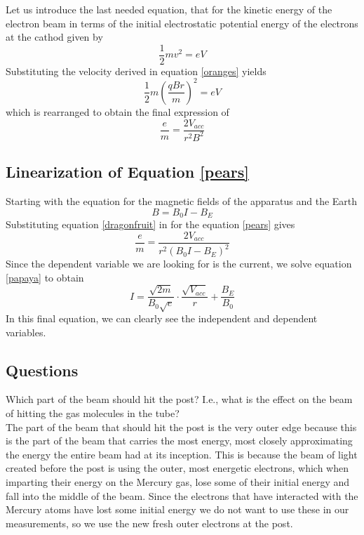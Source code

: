 \documentclass[aps,prl,10pt,twocolumn,floatfix]{revtex4-2}
\begin{document}
Let us introduce the last needed equation, that for the kinetic energy of the electron beam in terms of the initial electrostatic potential energy of the electrons at the cathod given by
\begin{equation}
\frac{1}{2}mv^2=eV
\end{equation}
Substituting the velocity derived in equation \ref{oranges} yields
\begin{equation*}
\frac{1}{2}m(\frac{qBr}{m})^2=eV
\end{equation*}
which is rearranged to obtain the final expression of
\begin{equation}\label{blueberries}
\frac{e}{m}=\frac{2V_{acc}}{r^2B^2}
\end{equation}

\subsection{Linearization of Equation \ref{pears}}
Starting with the equation for the magnetic fields of the apparatus and the Earth
\begin{equation}\label{dragonfruit}
B=B_0I-B_E
\end{equation}
Substituting equation \ref{dragonfruit} in for the equation \ref{pears} gives
\begin{equation*}\label{papaya}
\frac{e}{m}=\frac{2V_{acc}}{r^2(B_0I-B_E)^2}
\end{equation*}
Since the dependent variable we are looking for is the current, we  solve equation \ref{papaya} to obtain
\begin{equation}
I=\frac{\sqrt{2m}}{B_0\sqrt{e}}\cdot \frac{\sqrt{V_{acc}}}{r}+\frac{B_E}{B_0}
\end{equation}
In this final equation, we can clearly see the independent and dependent variables.
\subsection{Questions}
Which part of the beam should hit the post? I.e., what is the effect on the beam of hitting the gas
molecules in the tube?\\
The part of the beam that should hit the post is the very outer edge because this is the part of the beam that carries the most energy, most closely approximating the energy the entire beam had at its inception.
This is because the beam of light created before the post is using the outer, most energetic electrons, which when imparting their energy on the Mercury gas, lose some of their initial energy and fall into the middle of the beam.
Since the electrons that have interacted with the Mercury atoms have lost some initial energy we do not want to use these in our measurements, so we use the new fresh outer electrons at the post.
\end{document}
